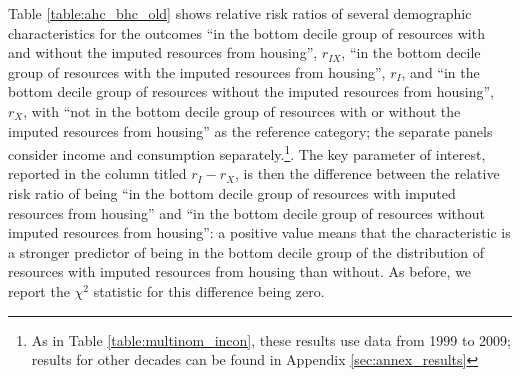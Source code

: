Table \ref{table:ahc_bhc_old} shows relative risk ratios of several demographic characteristics for the outcomes ``in the bottom decile group of resources with and without the imputed resources from housing'', $r_{IX}$, ``in the bottom decile group of resources with the imputed resources from housing'', $r_{I}$, and ``in the bottom decile group of resources without the imputed resources from housing'', $r_{X}$, with ``not in the bottom decile group of resources with or without the imputed resources from housing'' as the reference category; the separate panels consider income and consumption separately.\footnote{As in Table \ref{table:multinom_incon}, these results use data from 1999 to 2009; results for other decades can be found in Appendix \ref{sec:annex_results}}. The key parameter of interest, reported in the column titled $r_{I}-r_{X}$, is then the difference between the relative risk ratio of being ``in the bottom decile group of resources with imputed resources from housing'' and ``in the bottom decile group of resources without imputed resources from housing'': a positive value means that the characteristic is a stronger predictor of being in the bottom decile group of the distribution of resources with imputed resources from housing than without. As before, we report the $\chi^{2}$ statistic for this difference being zero. 

